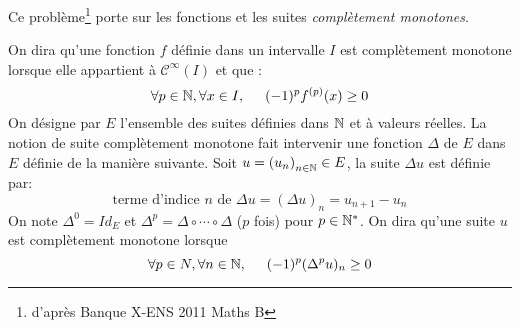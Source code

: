 Ce problème\footnote{d'après Banque X-ENS 2011 Maths B} porte sur les fonctions et les suites \emph{complètement monotones}.

On dira qu'une fonction $f$ définie dans un intervalle $I$ est complètement monotone lorsque elle appartient à $\mathcal C^\infty(I)$ et que :
\begin{displaymath}
  \forall p\in \mathbb{N}, \forall x\in I,\hspace{0.5cm}
(-1)^pf^{(p)}(x) \geq 0
\end{displaymath}
On désigne par $E$ l'ensemble des suites définies dans $\mathbb{N}$ et à valeurs réelles. La notion de suite complètement monotone fait intervenir une fonction $\Delta$ de $E$ dans $E$ définie de la manière suivante.\newline
Soit $u= \left( u_n\right) _{n\in \mathbb{N}} \in E$, la suite $\Delta u$ est définie par:
\begin{displaymath}
 \text{terme d'indice $n$ de }\Delta u = (\Delta u)_n = u_{n+1} - u_n
\end{displaymath}
On note $\Delta^0=Id_E$ et $\Delta ^p = \Delta \circ \cdots \circ \Delta$ ($p$ fois) pour $p\in\mathbb{N}^*$.
On dira qu'une suite $u$ est complètement monotone lorsque
\begin{displaymath}
 \forall p\in N, \forall n\in \mathbb{N},\hspace{0.5cm}
(-1)^p(\Delta^p u)_n \geq 0
\end{displaymath}

